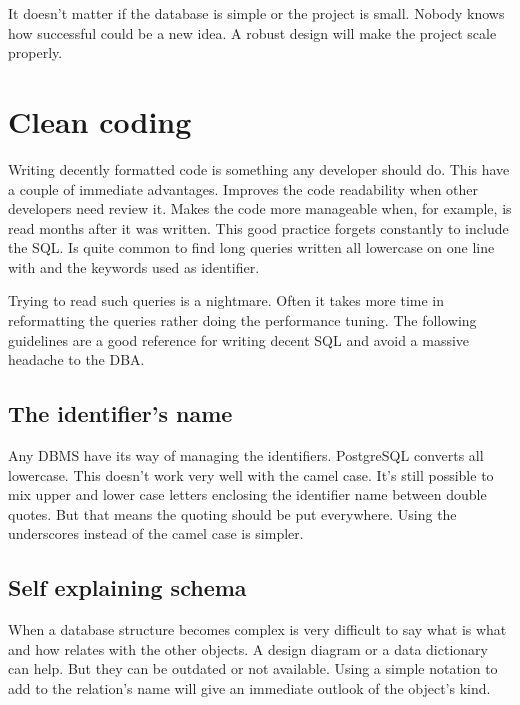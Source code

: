 It doesn't matter if the database is simple or the project is small. Nobody knows how successful could be
a new idea. A robust design will make the project scale properly.

\section{Clean coding}
Writing decently formatted code is something any developer should do. This have a couple of immediate
advantages. Improves the code readability when other developers need review it. Makes the code more
manageable when, for example, is read months after it was written. This good practice forgets constantly
to include the SQL. Is quite common to find long queries written all lowercase on one line with and the
keywords used as identifier.\newline

Trying to read such queries is a nightmare. Often it takes more time in reformatting the queries rather
doing the performance tuning. The following guidelines are a good reference for writing decent SQL and
avoid a massive headache to the DBA.

\subsection{The identifier's name}
Any DBMS have its way of managing the identifiers. PostgreSQL converts all lowercase. This doesn't work very
well with the camel case. It's still possible to mix upper and lower case letters enclosing the identifier
name between double quotes. But that means the quoting should be put everywhere. Using the underscores
instead of the camel case is simpler.

\subsection{Self explaining schema}
When a database structure becomes complex is very difficult to say what is what and how relates with the
other objects. A design diagram or a data dictionary can help. But they can be outdated or not available.
Using a simple notation to add to the relation's name will give an immediate outlook of the object's
kind.\newline


